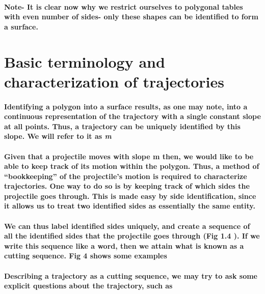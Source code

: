 \documentclass{report}
\begin{document}
\paragraph{Note- It is clear now why we restrict ourselves to polygonal tables with even number of sides- only these shapes can be identified to form a surface.}


\section{Basic terminology and characterization of trajectories}
\paragraph{Identifying a polygon into a surface results, as one may note, into a continuous representation of the trajectory with a single constant slope at all points. Thus, a trajectory can be uniquely identified by this slope. We will refer to it as \textit{m}}

\paragraph{Given that a projectile moves with slope m then, we would like to be able to keep track of its motion within the polygon. Thus, a method of “bookkeeping” of the projectile’s motion is required to characterize trajectories. One way to do so is by keeping track of which sides the projectile goes through. This is made easy by side identification, since it allows us to treat two identified sides as essentially the same entity.}

\paragraph{We can thus label identified sides uniquely, and create a sequence of all the identified sides that the projectile goes through (Fig 1.4 ). If we write this sequence like a word, then we attain what is known as a cutting sequence. Fig 4 shows some examples}


\paragraph{Describing a trajectory as a cutting sequence, we may try to ask some explicit questions about the trajectory, such as}
\end{document}
